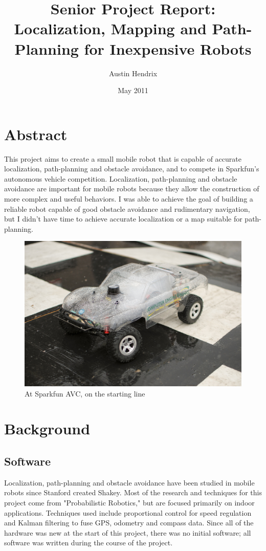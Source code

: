 \documentclass[a4paper,12pt]{article}
\begin{document}
\title{Senior Project Report: Localization, Mapping and Path-Planning for Inexpensive Robots}
\author{Austin Hendrix}
\date{May 2011}
\maketitle

\section{Abstract}
This project aims to create a small mobile robot that is capable of accurate localization, path-planning and obstacle avoidance, and to compete in Sparkfun's autonomous vehicle competition\cite{avc}. Localization, path-planning and obstacle avoidance are important for mobile robots because they allow the construction of more complex and useful behaviors. I was able to achieve the goal of building a reliable robot capable of good obstacle avoidance and rudimentary navigation, but I didn't have time to achieve accurate localization or a map suitable for path-planning.

\begin{figure}
\includegraphics[width=1.00\textwidth]{start}
\caption{At Sparkfun AVC, on the starting line}
\end{figure}

\section{Background}
\subsection{Software}
Localization, path-planning and obstacle avoidance have been studied in mobile robots since Stanford created Shakey\cite{shakey}. Most of the research and techniques for this project come from "Probabilistic Robotics,"\cite{thrun} but are focused primarily on indoor applications. Techniques used include proportional control for speed regulation and Kalman filtering to fuse GPS, odometry and compass data. Since all of the hardware was new at the start of this project, there was no initial software; all software was written during the course of the project.
\end{document}
